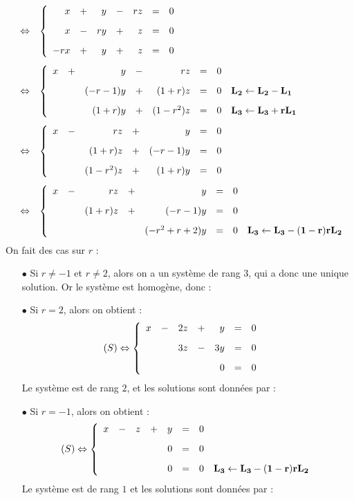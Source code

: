 \documentclass[a4paper, 11pt,reqno]{article}
\begin{document}
\begin{correction}
\begin{enumerate}
$$\begin{array}{rcl}
& \Leftrightarrow & 
\left\lbrace\begin{array}{rrrrrrr}
x & + & y & - & rz&  = &0\vsec\\
x & -& ry & + & z & = &0\vsec\\
-rx & +& y & + & z & = &0
\end{array}\right.\vsec\\
& \Leftrightarrow & 
\left\lbrace\begin{array}{rrrrrrrl}
x & + & y & - & rz&  = &0\vsec\\
& & (-r-1)y & + &(1+r) z & = &0 & \mathbf{L_2 \leftarrow L_2-L_1}\vsec\\
 & & (1+r)y & + & (1-r^2)z & = &0 & \mathbf{L_3 \leftarrow L_3+rL_1}
\end{array}\right.\vsec\\
& \Leftrightarrow & 
\left\lbrace\begin{array}{rrrrrrrr}
x & -& rz & + & y&  = &0\vsec\\
& & (1+r) z  & + & (-r-1)y& = &0 \vsec\\
 & & (1-r^2)z & + &  (1+r)y& = &0 
\end{array}\right.\vsec\\
& \Leftrightarrow & 
\left\lbrace\begin{array}{rrrrrrrr}
x & -& rz & + & y&  = &0\vsec\\
& & (1+r) z  & + & (-r-1)y& = &0 \vsec\\
 & &  &  &  (-r^2+r+2)y& = &0 & \mathbf{L_3 \leftarrow L_3-(1-r)rL_2}
\end{array}\right.
\end{array}$$
On fait des cas sur $r$ :
\begin{itemize}
\item[$\bullet$] Si $r\not= -1$ et $r\not= 2$, alors  on a un syst\`eme de rang $3$, qui a donc une unique solution. Or le syst\`eme est homog\`ene, donc : 
\item[$\bullet$] Si $r=2$, alors on obtient :
$$(S) \Leftrightarrow 
\left\lbrace\begin{array}{rrrrrrrr}
x & -& 2z & + & y&  = &0\vsec\\
& & 3 z  & - & 3y& = &0 \vsec\\
 & &  &  &  0& = &0 &
 \end{array}\right.$$
 Le syst\`eme est de rang $2$, et les solutions sont donn\'ees par : 
\item[$\bullet$] Si $r=-1$, alors on obtient :
$$(S) \Leftrightarrow 
\left\lbrace\begin{array}{rrrrrrrr}
x & -& z & + & y&  = &0\vsec\\
& &   &  & 0& = &0 \vsec\\
 & &  &  &  0& = &0 & \mathbf{L_3 \leftarrow L_3-(1-r)rL_2}
\end{array}\right.$$
Le syst\`eme est de rang $1$ et les solutions sont donn\'ees par : 
\end{itemize}
\end{enumerate}
\end{correction}
\end{document}
